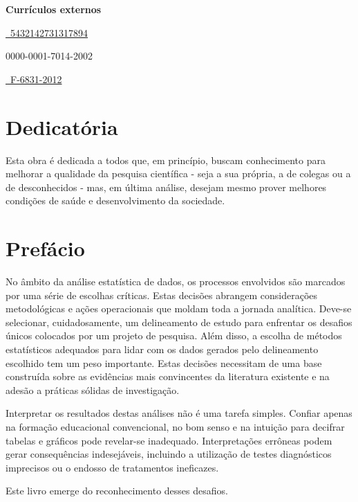 \documentclass[
]{book}
\begin{document}
\textbf{Currículos externos}

\href{http://lattes.cnpq.br/5432142731317894}{~5432142731317894}

0000-0001-7014-2002

\href{https://publons.com/researcher/F-6831-2012}{~F-6831-2012}

\hypertarget{dedicatuxf3ria}{%
\chapter*{Dedicatória}\label{dedicatuxf3ria}}

\markboth{}{}

Esta obra é dedicada a todos que, em princípio, buscam conhecimento para melhorar a qualidade da pesquisa científica - seja a sua própria, a de colegas ou a de desconhecidos - mas, em última análise, desejam mesmo prover melhores condições de saúde e desenvolvimento da sociedade.

\hypertarget{prefuxe1cio}{%
\chapter*{Prefácio}\label{prefuxe1cio}}

\markboth{}{}

No âmbito da análise estatística de dados, os processos envolvidos são marcados por uma série de escolhas críticas. Estas decisões abrangem considerações metodológicas e ações operacionais que moldam toda a jornada analítica. Deve-se selecionar, cuidadosamente, um delineamento de estudo para enfrentar os desafios únicos colocados por um projeto de pesquisa. Além disso, a escolha de métodos estatísticos adequados para lidar com os dados gerados pelo delineamento escolhido tem um peso importante. Estas decisões necessitam de uma base construída sobre as evidências mais convincentes da literatura existente e na adesão a práticas sólidas de investigação.

Interpretar os resultados destas análises não é uma tarefa simples. Confiar apenas na formação educacional convencional, no bom senso e na intuição para decifrar tabelas e gráficos pode revelar-se inadequado. Interpretações errôneas podem gerar consequências indesejáveis, incluindo a utilização de testes diagnósticos imprecisos ou o endosso de tratamentos ineficazes.

Este livro emerge do reconhecimento desses desafios.
\end{document}
